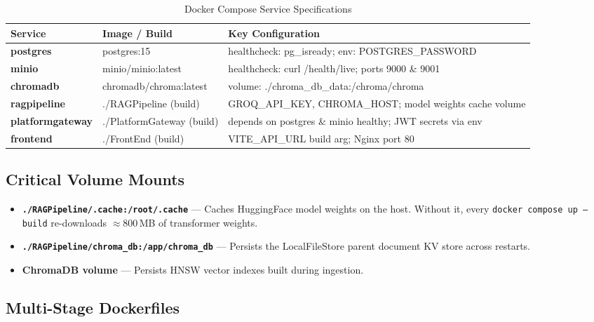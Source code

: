 \documentclass[12pt,a4paper]{report}
\begin{document}
\begin{table}[htbp]
\centering
\caption{Docker Compose Service Specifications}
\renewcommand{\arraystretch}{1.4}
\begin{tabularx}{\linewidth}{>{\bfseries\sffamily}l l X}
\toprule
\rowcolor{DeepRose!10}
Service & Image / Build & Key Configuration \\
\midrule
postgres         & postgres:15             & healthcheck: pg\_isready; env: POSTGRES\_PASSWORD \\
minio            & minio/minio:latest      & healthcheck: curl /health/live; ports 9000 \& 9001 \\
chromadb         & chromadb/chroma:latest  & volume: ./chroma\_db\_data:/chroma/chroma \\
ragpipeline      & ./RAGPipeline (build)   & GROQ\_API\_KEY, CHROMA\_HOST; model weights cache volume \\
platformgateway  & ./PlatformGateway (build)& depends on postgres \& minio healthy; JWT secrets via env \\
frontend         & ./FrontEnd (build)      & VITE\_API\_URL build arg; Nginx port 80 \\
\bottomrule
\end{tabularx}
\end{table}

\subsection{Critical Volume Mounts}

\begin{itemize}
  \item \textbf{\texttt{./RAGPipeline/.cache:/root/.cache}} — Caches HuggingFace model weights on the host. Without it, every \texttt{docker compose up --build} re-downloads $\approx$800\,MB of transformer weights.
  \item \textbf{\texttt{./RAGPipeline/chroma\_db:/app/chroma\_db}} — Persists the LocalFileStore parent document KV store across restarts.
  \item \textbf{ChromaDB volume} — Persists HNSW vector indexes built during ingestion.
\end{itemize}

\subsection{Multi-Stage Dockerfiles}
\end{document}
